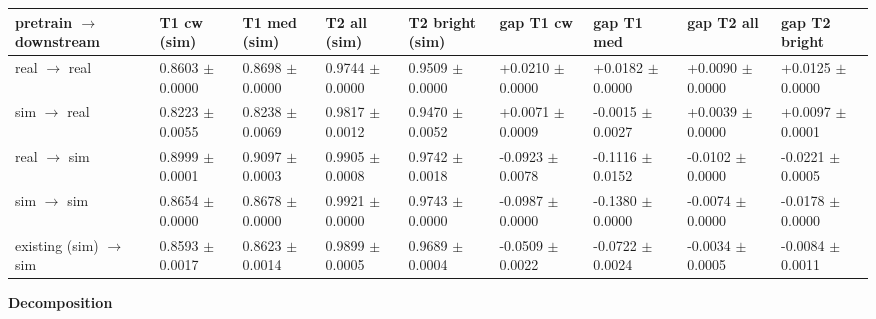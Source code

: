 \documentclass[10pt,a4paper]{article}
\begin{document}
\begin{center}\scriptsize
\setlength{\tabcolsep}{3pt}\renewcommand{\arraystretch}{1.15}
\begin{tabularx}{\linewidth}{LLLLLLLLL}
\toprule
\textbf{pretrain $\rightarrow$ downstream} & \textbf{T1 cw (sim)} & \textbf{T1 med (sim)} & \textbf{T2 all (sim)} & \textbf{T2 bright (sim)} & \textbf{gap T1 cw} & \textbf{gap T1 med} & \textbf{gap T2 all} & \textbf{gap T2 bright} \\
\midrule
real $\rightarrow$ real & 0.8603 $\pm$ 0.0000 & 0.8698 $\pm$ 0.0000 & 0.9744 $\pm$ 0.0000 & 0.9509 $\pm$ 0.0000 & +0.0210 $\pm$ 0.0000 & +0.0182 $\pm$ 0.0000 & +0.0090 $\pm$ 0.0000 & +0.0125 $\pm$ 0.0000 \\
sim $\rightarrow$ real & 0.8223 $\pm$ 0.0055 & 0.8238 $\pm$ 0.0069 & 0.9817 $\pm$ 0.0012 & 0.9470 $\pm$ 0.0052 & +0.0071 $\pm$ 0.0009 & -0.0015 $\pm$ 0.0027 & +0.0039 $\pm$ 0.0000 & +0.0097 $\pm$ 0.0001 \\
real $\rightarrow$ sim & 0.8999 $\pm$ 0.0001 & 0.9097 $\pm$ 0.0003 & 0.9905 $\pm$ 0.0008 & 0.9742 $\pm$ 0.0018 & -0.0923 $\pm$ 0.0078 & -0.1116 $\pm$ 0.0152 & -0.0102 $\pm$ 0.0000 & -0.0221 $\pm$ 0.0005 \\
sim $\rightarrow$ sim & 0.8654 $\pm$ 0.0000 & 0.8678 $\pm$ 0.0000 & 0.9921 $\pm$ 0.0000 & 0.9743 $\pm$ 0.0000 & -0.0987 $\pm$ 0.0000 & -0.1380 $\pm$ 0.0000 & -0.0074 $\pm$ 0.0000 & -0.0178 $\pm$ 0.0000 \\
existing (sim) $\rightarrow$ sim & 0.8593 $\pm$ 0.0017 & 0.8623 $\pm$ 0.0014 & 0.9899 $\pm$ 0.0005 & 0.9689 $\pm$ 0.0004 & -0.0509 $\pm$ 0.0022 & -0.0722 $\pm$ 0.0024 & -0.0034 $\pm$ 0.0005 & -0.0084 $\pm$ 0.0011 \\
\bottomrule
\end{tabularx}
\end{center}
\textbf{Decomposition}
\end{document}
